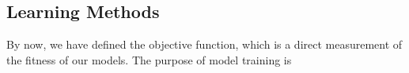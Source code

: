 \subsection {Learning Methods}
By now, we have defined the objective function, which is a direct measurement of the fitness of our models. The purpose of model training is 